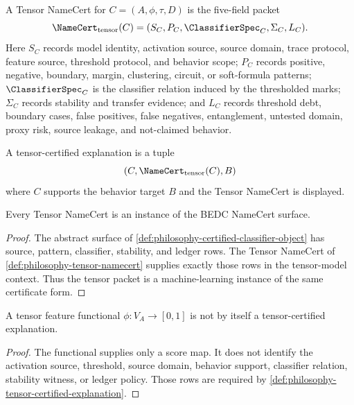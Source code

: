 \begin{definition}
\label{def:philosophy-tensor-namecert}
A Tensor NameCert for $C=(A,\phi,\tau,D)$ is the five-field packet
$$
\NameCert_{\mathrm{tensor}}(C)
=
(S_C,P_C,\ClassifierSpec_C,\Sigma_C,L_C).
$$
Here $S_C$ records model identity, activation source, source domain,
trace protocol, feature source, threshold protocol, and behavior scope;
$P_C$ records positive, negative, boundary, margin, clustering, circuit,
or soft-formula patterns; $\ClassifierSpec_C$ is the classifier relation
induced by the thresholded marks; $\Sigma_C$ records stability and
transfer evidence; and $L_C$ records threshold debt, boundary cases,
false positives, false negatives, entanglement, untested domain, proxy
risk, source leakage, and not-claimed behavior.
\end{definition}

\begin{definition}
\label{def:philosophy-tensor-certified-explanation}
A tensor-certified explanation is a tuple
$$
(C,\NameCert_{\mathrm{tensor}}(C),B)
$$
where $C$ supports the behavior target $B$ and the Tensor NameCert is
displayed.
\end{definition}

\begin{theorem}
\label{thm:philosophy-tensor-namecert-instantiates-namecert}
Every Tensor NameCert is an instance of the BEDC NameCert surface.
\end{theorem}
\begin{proof}
The abstract surface of
\autoref{def:philosophy-certified-classifier-object} has source,
pattern, classifier, stability, and ledger rows. The Tensor NameCert of
\autoref{def:philosophy-tensor-namecert} supplies exactly those rows in
the tensor-model context. Thus the tensor packet is a machine-learning
instance of the same certificate form.
\end{proof}

\begin{theorem}
\label{thm:philosophy-feature-functional-not-explanation}
A tensor feature functional $\phi:V_A\to[0,1]$ is not by itself a
tensor-certified explanation.
\end{theorem}
\begin{proof}
The functional supplies only a score map. It does not identify the
activation source, threshold, source domain, behavior support,
classifier relation, stability witness, or ledger policy. Those rows are
required by \autoref{def:philosophy-tensor-certified-explanation}.
\end{proof}

